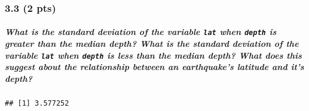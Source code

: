 \documentclass[
]{article}
\newenvironment{Shaded}{\begin{snugshade}}{\end{snugshade}}
\newcommand{\FunctionTok}[1]{\textcolor[rgb]{0.00,0.00,0.00}{#1}}
\newcommand{\NormalTok}[1]{#1}
\newcommand{\SpecialCharTok}[1]{\textcolor[rgb]{0.00,0.00,0.00}{#1}}
\begin{document}
\hypertarget{pts-1}{%
\subsubsection{3.3 (2 pts)}\label{pts-1}}

\hypertarget{what-is-the-standard-deviation-of-the-variable-lat-when-depth-is-greater-than-the-median-depth-what-is-the-standard-deviation-of-the-variable-lat-when-depth-is-less-than-the-median-depth-what-does-this-suggest-about-the-relationship-between-an-earthquakes-latitude-and-its-depth}{%
\subparagraph{\texorpdfstring{What is the standard deviation of the
variable \texttt{lat} when \texttt{depth} is \emph{greater than} the
median depth? What is the standard deviation of the variable
\texttt{lat} when \texttt{depth} is \emph{less than} the median depth?
What does this suggest about the relationship between an earthquake's
latitude and it's
depth?}{What is the standard deviation of the variable lat when depth is greater than the median depth? What is the standard deviation of the variable lat when depth is less than the median depth? What does this suggest about the relationship between an earthquake's latitude and it's depth?}}\label{what-is-the-standard-deviation-of-the-variable-lat-when-depth-is-greater-than-the-median-depth-what-is-the-standard-deviation-of-the-variable-lat-when-depth-is-less-than-the-median-depth-what-does-this-suggest-about-the-relationship-between-an-earthquakes-latitude-and-its-depth}}

\begin{Shaded}
\end{Shaded}

\begin{verbatim}
## [1] 3.577252
\end{verbatim}

\begin{Shaded}
\end{Shaded}
\end{document}
